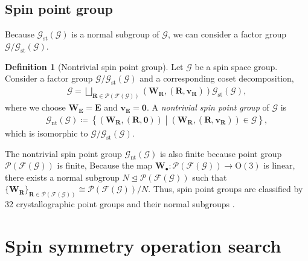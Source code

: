 \documentclass[a4paper, 11pt]{article}
\theoremstyle{definition}
\newcommand{\term}[1]{\textit{#1}}
\newcommand{\relmiddle}[1]{\mathrel{}\middle#1\mathrel{}}
\newcommand{\set}[2]{\left\{ #1 \relmiddle| #2 \right\}}
\newtheorem{definition}[theorem]{Definition}
\begin{document}
\subsection{Spin point group}

Because $\mathcal{G}_{\mathrm{st}}(\mathcal{G})$ is a normal subgroup of $\mathcal{G}$, we can consider a factor group $\mathcal{G} / \mathcal{G}_{\mathrm{st}}(\mathcal{G})$.
\begin{screen}
  \begin{definition}[Nontrivial spin point group]
    Let $\mathcal{G}$ be a spin space group.
    Consider a factor group $\mathcal{G} / \mathcal{G}_{\mathrm{st}}(\mathcal{G})$ and a corresponding coset decomposition,
    \begin{align}
      \mathcal{G}
        = \bigsqcup_{ \bm{R} \in \mathcal{P}(\mathcal{F}(\mathcal{G})) } (\bm{W}_{\bm{R}}, (\bm{R}, \bm{v}_{\bm{R}})) \mathcal{G}_{\mathrm{st}}(\mathcal{G}),
    \end{align}
    where we choose $\bm{W}_{\bm{E}} = \bm{E}$ and $\bm{v}_{\bm{E}} = \bm{0}$.
    A \term{nontrivial spin point group} of $\mathcal{G}$ is
    \begin{align}
      \mathcal{G}_{\mathrm{nt}}(\mathcal{G})
      \coloneqq
      \set{ (\bm{W}_{\bm{R}}, (\bm{R}, \bm{0})) }{ (\bm{W}_{\bm{R}}, (\bm{R}, \bm{v}_{\bm{R}})) \in \mathcal{G} },
    \end{align}
    which is isomorphic to $\mathcal{G} / \mathcal{G}_{\mathrm{st}}(\mathcal{G})$.
  \end{definition}
\end{screen}

The nontrivial spin point group $\mathcal{G}_{\mathrm{nt}}(\mathcal{G})$ is also finite because point group $\mathcal{P}(\mathcal{F}(\mathcal{G}))$ is finite,
Because the map $\bm{W}_{\bullet}: \mathcal{P}(\mathcal{F}(\mathcal{G})) \to \mathrm{O}(3)$ is linear, there exists a normal subgroup $N \trianglelefteq \mathcal{P}(\mathcal{F}(\mathcal{G}))$ such that $\{ \bm{W}_{\bm{R}} \}_{ \bm{R} \in \mathcal{P}(\mathcal{F}(\mathcal{G})) } \cong \mathcal{P}(\mathcal{F}(\mathcal{G})) / N$.
Thus, spin point groups are classified by 32 crystallographic point groups and their normal subgroups \cite{Litvin:a14103}.

\section{Spin symmetry operation search}
\end{document}

